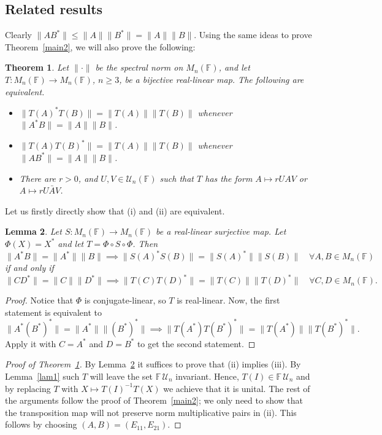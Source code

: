\documentclass[11pt]{article}
\newtheorem{theorem}{Theorem}[section]
\newtheorem{lemma}[theorem]{Lemma}
\numberwithin{equation}{section}
\def\IF{{\mathbb F}}
\begin{document}
\subsection{Related results}
Clearly
$\|AB^*\| \le \|A\| \|B^*\| = \|A\| \|B\|$.
Using the same ideas to prove Theorem~\ref{main2}, we will also prove the following:

\begin{theorem}\label{thm:generalization_n>2} Let $\|\cdot\|$ be the spectral norm on $M_n(\IF)$, and let $T\colon  M_n(\IF) \rightarrow M_n(\IF)$,  $n\ge 3$, be a bijective real-linear map. The following are equivalent.
\begin{itemize}
\item[{\rm (i)}] $\|T(A)^* T(B)\| = \|T(A)\| \|T(B)\|$ whenever $\|A^*B\| = \|A\| \|B\|$.
\item[{\rm (ii)}] $\|T(A) T(B)^*\| = \|T(A)\| \|T(B)\|$ whenever $\|AB^*\| = \|A\| \|B\|$.
\item[{\rm (iii)}] There are $r > 0$, and $U, V \in {\mathcal U}_n(\IF)$ such that $T$ has the form
$A \mapsto rUAV$ or $A \mapsto rU\bar{A}V$.
\end{itemize}
\end{theorem}
Let us firstly directly show that (i) and (ii) are equivalent.
\begin{lemma}\label{L:equiv}
Let $S\colon M_n(\IF) \to M_n(\IF)$ be a real-linear surjective map.  Let $\Phi(X)=X^*$ and let $T=\Phi \circ S \circ \Phi$.  Then
$$\|A^*B\| = \|A^*\| \|B\| \implies \|S(A)^* S(B)\| = \|S(A)^*\| \|S(B)\| \quad \forall A,B \in M_n(\IF)$$
if and only if
$$\|CD^*\| = \|C\| \|D^*\| \implies \|T(C) T(D)^* \| = \|T(C)\| \|T(D)^* \|\quad \forall C,D \in M_n(\IF).$$
\end{lemma}


\begin{proof}
Notice that $\Phi$ is conjugate-linear, so $T$ is
real-linear. Now,
the first statement is equivalent to
\begin{equation*}
\|A^* (B^*)^*\| = \|A^*\| \|(B^*)^*\| \implies \|T(A^*) T(B^*)^*\| = \|T(A^*)\| \|T(B^*)^*\|.
\end{equation*}
Apply it with $C=A^*$ and $D=B^*$ to get the second statement.
\end{proof}
\begin{proof}[Proof of Theorem~\ref{thm:generalization_n>2}]
  By Lemma~\ref{L:equiv}  it suffices to prove that (ii) implies (iii). By Lemma~\ref{lam1}  such $T$ will leave the set $\IF\, {\mathcal U}_n$ invariant. Hence, $T(I)\in\IF\,{\mathcal U}_n$ and by replacing $T$ with $X\mapsto T(I)^{-1}T(X)$ we achieve that it is unital. The rest of the arguments follow  the proof of Theorem~\ref{main2}; we only need to show that the transposition map will not preserve norm multiplicative pairs in (ii). This follows by choosing
  $(A,B)=(E_{11},E_{21})$.
\end{proof}
\end{document}
